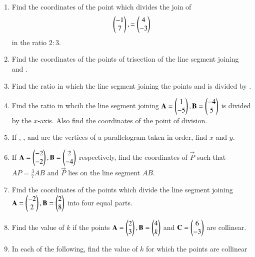 \renewcommand{\theequation}{\theenumi}
\begin{enumerate}[label=\arabic*.,ref=\thesubsection.\theenumi]
\item Find the coordinates of the point which divides the join of 
\begin{align}
\begin{pmatrix}-1\\7\end{pmatrix}, = \begin{pmatrix}4\\-3\end{pmatrix}
\end{align}
%
in the ratio $2:3$.
\item Find the coordinates of the points of trisection of the line segment joining  and .
\item Find the ratio in which the line segment joining the points  and  is divided by .
\item Find the ratio in whcih the line segment joining $\mathbf{A}=\begin{pmatrix}1\\-5\end{pmatrix}, \mathbf{B}=\begin{pmatrix}-4\\5\end{pmatrix}$ is divided by the $x$-axis.  Also find the coordinates of the point of division.
\item If , ,  and  are the vertices of a parallelogram taken in order, find $x$ and $y$.
\item If $\mathbf{A}=\begin{pmatrix}-2\\-2\end{pmatrix}, \mathbf{B}=\begin{pmatrix}2\\-4\end{pmatrix}$ respectively, find the coordinates of $\vec{P}$ such that $AP = \frac{3}{7}AB$ and $\vec{P}$ lies on the line segment $AB$.
\item Find the coordinates of the points which divide the line segment joining $\mathbf{A}=\begin{pmatrix}-2\\2\end{pmatrix}, \mathbf{B}=\begin{pmatrix}2\\8\end{pmatrix}$ into four equal parts.
\item Find the value of $k$ if the points $\mathbf{A}=\begin{pmatrix}2\\3\end{pmatrix}, \mathbf{B}=\begin{pmatrix}4\\k\end{pmatrix}$ and $\mathbf{C}=\begin{pmatrix}6\\-3\end{pmatrix}$ are collinear.
\item  In each of the following, find the value of $k$ for which the points are collinear


\end{enumerate}
